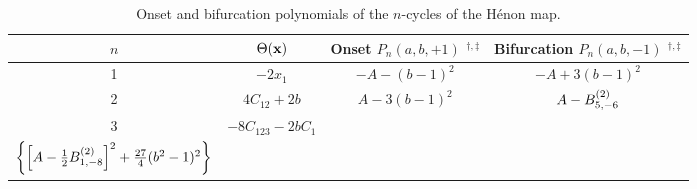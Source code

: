 \documentclass[twocolumn]{revtex4-1}
\begin{document}
\begin{table*}[t]\footnotesize
\caption{Onset and bifurcation polynomials of the $n$-cycles of the H\'enon map.}
\begin{center}
\begin{tabular*}{\linewidth}{c c c c}
\hline
$n$
& $\Theta(\mathbf{x})$
& Onset $P_n(a, b, +1)$ $^{\dagger, \ddagger}$
& Bifurcation $P_n(a, b, -1)$ $^{\dagger, \ddagger}$ \\
\hline
1
& $-2 x_1$
& $-A - (b-1)^2$
& $-A + 3(b-1)^2$ \\
2
& $4 C_{12} + 2 b$
& $A-3 (b-1)^2$
& $A - B^{(2)}_{5,-6}$ \\
3
&
  $-8C_{123}-2b C_1$
&
  \begin{minipage}[h]{.35\linewidth}
  $\left( -A + \BB{7}{10} \right)$ \\
  $\left\{ \left[ A -\frac{1}{2}B^{(2)}_{1,-8} \right]^2 + \frac{27}{4} (b^2-1)^2 \right\}$
  \end{minipage}


\end{tabular*}
\end{center}
\end{table*}
\end{document}
